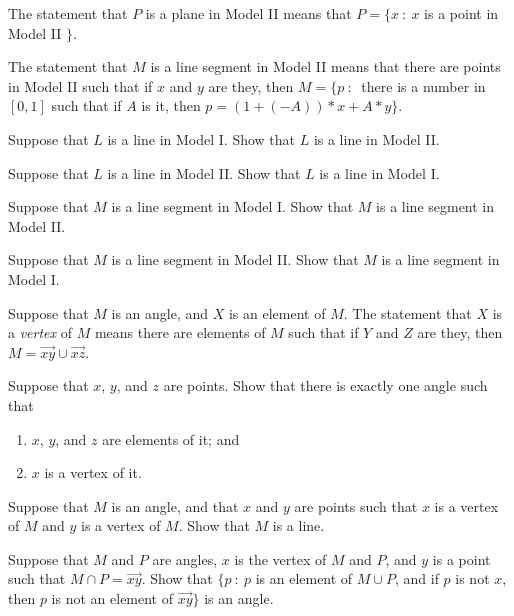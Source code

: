 \documentclass{article}
\begin{document}
\begin{description}
     The statement that $P$ is a plane in Model II means that $P = \{ x\ :\ x$ is a point in Model II $\}$.

     The statement that $M$ is a line segment in Model II means that there are points in Model II such that if $x$ and $y$ are they, then $M = \{ p\ :\ $ there is a number in $[0,1]$ such that if $A$ is it, then $p=(1+(-A))*x+A*y \}$.

  \item[Problem 28:] Suppose that $L$ is a line in Model I. Show that $L$ is a line in Model II.

  \item[Problem 29:] Suppose that $L$ is a line in Model II. Show that $L$ is a line in Model I.

  \item[Problem 30:] Suppose that $M$ is a line segment in Model I. Show that $M$ is a line segment in Model II.

  \item[Problem 31:] Suppose that $M$ is a line segment in Model II. Show that $M$ is a line segment in Model I.

  \item[Definition 9:] Suppose that $M$ is an angle, and $X$ is an element of $M$. The statement that $X$ is a \emph{vertex} of $M$ means there are elements of $M$ such that if $Y$ and $Z$ are they, then $M = \overrightarrow{xy} \cup \overrightarrow{xz}$.

  \item[Problem 32:] Suppose that $x$, $y$, and $z$ are points. Show that there is exactly one angle such that
    \begin{enumerate}[\hspace{1cm}(i.)]
      \item $x$, $y$, and $z$ are elements of it; and
      \item $x$ is a vertex of it.
    \end{enumerate}

  \item[Problem 33:] Suppose that $M$ is an angle, and that $x$ and $y$ are points such that $x$ is a vertex of $M$ and $y$ is a vertex of $M$. Show that $M$ is a line.

  \item[Problem 26SF:] Suppose that $M$ and $P$ are angles, $x$ is the vertex of $M$ and $P$, and $y$ is a point such that $M \cap P = \overrightarrow{xy}$. Show that $\{ p\ :\ p$ is an element of $M \cup P$, and if $p$ is not $x$, then $p$ is not an element of $\overrightarrow{xy} \}$ is an angle.


\end{description}
\end{document}
